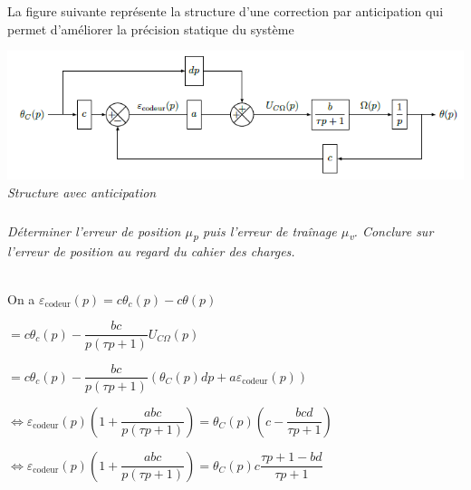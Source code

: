 \documentclass[10pt,fleqn]{article} %
\begin{document}
\begin{multicols}{2}
%
%  
%  


La figure suivante représente la structure d'une correction par anticipation
qui permet d'améliorer la précision statique du système

\begin{center}
\includegraphics[width=1.0\linewidth]{images/image17.png}
\textit{Structure avec anticipation \label{fig16}}
\end{center}

\subparagraph{\label{q13}}\textit{Déterminer l'erreur de position $\mu$\emph{\textsubscript{p}} puis
  l'erreur de traînage $\mu$\emph{\textsubscript{v}}. Conclure sur l'erreur
  de position au regard du cahier des charges.}
\ifprof
\begin{corrige} ~\\

On a 
$\varepsilon_{\text{codeur}}(p)=c\theta_c(p)-c\theta(p)$ 

$=c\theta_c(p)-\dfrac{bc}{p\left(\tau p + 1 \right)}U_{C \Omega }(p)$

 $=c\theta_c(p)-\dfrac{bc}{p\left(\tau p + 1 \right)}\left( \theta_C(p) dp + a \varepsilon_{\text{codeur}}(p) \right)$

$\Leftrightarrow \varepsilon_{\text{codeur}}(p)\left(1+\dfrac{abc}{p\left(\tau p + 1 \right)}\right) = \theta_C(p)  \left(c-\dfrac{bcd}{\tau p + 1 } \right)$

$\Leftrightarrow \varepsilon_{\text{codeur}}(p)\left(1+\dfrac{abc}{p\left(\tau p + 1 \right)}\right) = \theta_C(p)  c \dfrac{\tau p + 1 -bd}{\tau p + 1 } $


\end{corrige}
\end{multicols}
\end{document}
